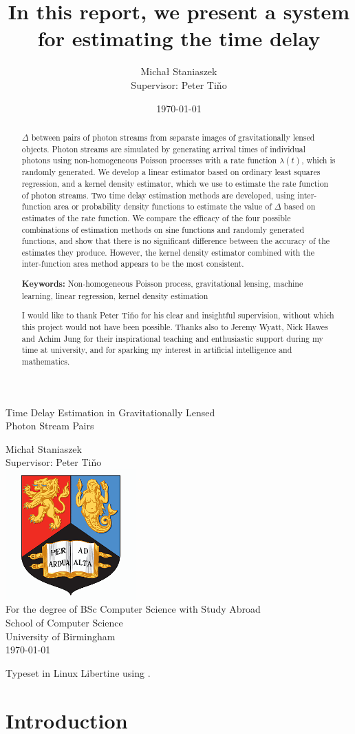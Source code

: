 \documentclass[a4paper,11pt]{article}
\title{\noindent In this report, we present a system for estimating the time delay}
\author{\Large{Micha{\l} Staniaszek} \\\small{Supervisor: Peter Ti{\v{n}}o}}
\date{\today}
\renewcommand{\maketitle}
{\begin{titlepage}
\pagenumbering{roman}
\begin{spacing}{1} 
\begin{large}
\begin{center}
\mbox{}
\vfill
\begin{sc}
Time Delay Estimation in Gravitationally Lensed\\ Photon Stream Pairs\\
\end{sc}
\vspace*{15mm}
Micha{\l} Staniaszek\\
Supervisor: Peter Ti{\v{n}}o\\
\vspace*{4mm}
\includegraphics[width=50mm,height=50mm]{images/crest.png}\\
For the degree of BSc Computer Science with Study Abroad\\
School of Computer Science\\
University of Birmingham\\
\vspace*{10mm}
\today
\vfill
\vspace*{.2in}
\end{center}
\end{large}
\end{spacing}
\end{titlepage}
}%
\begin{document}
\maketitle




\begin{abstract}
$\Delta$ between pairs of photon streams from separate images of gravitationally
lensed objects. Photon streams are simulated by generating arrival times of
individual photons using non-homogeneous Poisson processes with a rate function
$\lambda(t)$, which is randomly generated. We develop a linear estimator based
on ordinary least squares regression, and a kernel density estimator, which we
use to estimate the rate function of photon streams. Two time delay estimation
methods are developed, using inter-function area or probability density
functions to estimate the value of $\Delta$ based on estimates of the rate
function. We compare the efficacy of the four possible combinations of
estimation methods on sine functions and randomly generated functions, and show
that there is no significant difference between the accuracy of the estimates
they produce. However, the kernel density estimator combined with the
inter-function area method appears to be the most consistent.

\vspace{1.0cm}\noindent\textbf{Keywords:} Non-homogeneous Poisson process, gravitational lensing,
machine learning, linear regression, kernel density estimation
\end{abstract}

\vspace{2.0cm}\renewcommand{\abstractname}{Acknowledgements}
\begin{abstract} 
\noindent I would like to thank Peter Ti{\v{n}}o for his clear
 and insightful supervision, without which this project would not have been
 possible. Thanks also to Jeremy Wyatt, Nick Hawes and Achim Jung for their
 inspirational teaching and enthusiastic support during my time at university,
 and for sparking my interest in artificial intelligence and mathematics.
\end{abstract}

\begin{center}
\vspace*{\fill}\scriptsize{Typeset in Linux Libertine using \XeLaTeX}.
\end{center}

\newpage
\tableofcontents
\newpage
{}
\section{Introduction}
\label{sec-1}
\end{document}
